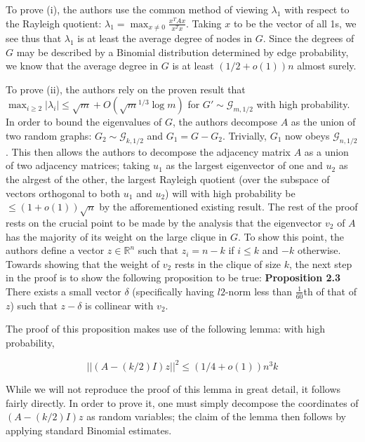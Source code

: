 \documentclass{article}
\theoremstyle{definition}
\begin{document}
To prove (i), the authors use the common method of viewing $\lambda_1$ 
with respect to the Rayleigh quotient: 
$\lambda_1 = \max_{x\neq 0} \frac{x^TAx}{x^Tx}$.  Taking $x$ to be the 
vector of all 1s, we see thus that $\lambda_1$ is at least the average 
degree of nodes in $G$.  Since the degrees of $G$ may be described by 
a Binomial distribution determined by edge probability, we know that 
the average degree in $G$ is at least $(1/2 + o(1))n$ almost surely.

To prove (ii), the authors rely on the proven result that 
$\max_{i\geq 2} \lvert \lambda_i \rvert \leq \sqrt{m} + O(\sqrt{m}^{1/3} \log{m})$
for $G' \sim \mathcal{G}_{m,1/2}$ with high probability.  In order to 
bound the eigenvalues of $G$, the authors decompose $A$ as the union of 
two random graphs: $G_2 \sim \mathcal{G}_{k,1/2}$ and $G_1 = G - G_2$.  
Trivially, $G_1$ now obeys $\mathcal{G}_{n,1/2}$.  This then allows the authors
to decompose the adjacency matrix $A$ as a union of two adjacency matrices;
taking $u_1$ as the largest eigenvector of one and $u_2$ as the alrgest of 
the other, the largest Rayleigh quotient (over the subspace of vectors 
orthogonal to both $u_1$ and $u_2$) will with high probability be 
$\leq (1+o(1))\sqrt{n}$ by the afforementioned existing result.
\newline\newline
The rest of the proof rests on the crucial point to be made by the analysis 
that the eigenvector $v_2$ of $A$ has the majority of its weight 
on the large clique in $G$.  To show this point, the authors 
define a vector $z \in \mathbb{R}^{n}$ such that $z_i = n-k$ if 
$i \leq k$ and $-k$ otherwise.  Towards showing that the weight of 
$v_2$ rests in the clique of size $k$, the next step in the proof is to 
show the following proposition to be true:
\newline\newline
\noindent \textbf{Proposition 2.3 } There exists a small vector $\delta$
(specifically having $l2$-norm less than $\frac{1}{60}$th of that of $z$)
such that $z-\delta$ is collinear with $v_2$.

The proof of this proposition makes use of the following lemma: with 
high probability,

\[ \lvert \lvert (A - (k/2)I)z \rvert \rvert^2 \leq (1/4 + o(1))n^3k \]

\noindent While we will not reproduce the proof of this lemma in 
great detail, it follows fairly directly.  In order to prove it, one 
must simply decompose the coordinates of $(A - (k/2)I)z$ as 
random variables; the claim of the lemma then follows by applying 
standard Binomial estimates.
\end{document}

